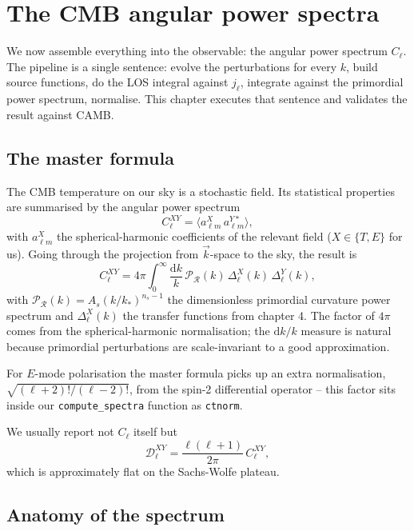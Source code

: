 \section{The CMB angular power spectra}
\label{ch:cls}

We now assemble everything into the observable: the angular power spectrum $C_\ell$. The pipeline is a single sentence: evolve the perturbations for every $k$, build source functions, do the LOS integral against $j_\ell$, integrate against the primordial power spectrum, normalise. This chapter executes that sentence and validates the result against CAMB.

\subsection{The master formula}

The CMB temperature on our sky is a stochastic field. Its statistical properties are summarised by the angular power spectrum
\[
  C_\ell^{XY} = \langle a^X_{\ell m}\, a^{Y*}_{\ell m}\rangle,
\]
with $a^X_{\ell m}$ the spherical-harmonic coefficients of the relevant field ($X \in \{T, E\}$ for us). Going through the projection from $\vec k$-space to the sky, the result is
\begin{equation}
  C_\ell^{XY} = 4\pi \int_0^\infty \frac{\mathrm{d}k}{k}\, \mathcal{P}_\mathcal{R}(k)\, \Delta_\ell^X(k)\, \Delta_\ell^Y(k),
  \label{eq:Cl_master}
\end{equation}
with $\mathcal{P}_\mathcal{R}(k) = A_s (k/k_*)^{n_s - 1}$ the dimensionless primordial curvature power spectrum and $\Delta_\ell^X(k)$ the transfer functions from chapter 4. The factor of $4\pi$ comes from the spherical-harmonic normalisation; the $\mathrm{d}k/k$ measure is natural because primordial perturbations are scale-invariant to a good approximation.

For $E$-mode polarisation the master formula picks up an extra normalisation, $\sqrt{(\ell+2)!/(\ell-2)!}$, from the spin-2 differential operator -- this factor sits inside our \texttt{compute\_spectra} function as \texttt{ctnorm}.

We usually report not $C_\ell$ itself but
\[
  \mathcal{D}_\ell^{XY} = \frac{\ell(\ell + 1)}{2\pi}\, C_\ell^{XY},
\]
which is approximately flat on the Sachs-Wolfe plateau.

\subsection{Anatomy of the spectrum}

